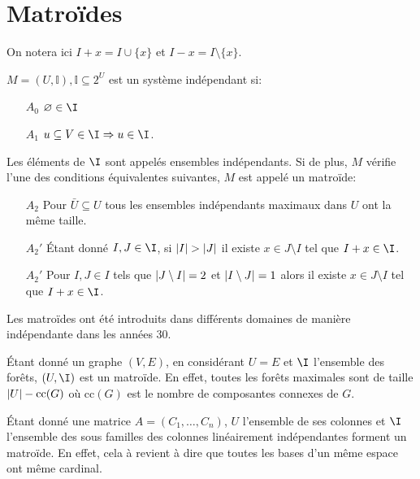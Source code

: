 \documentclass[math, info]{cours}
\begin{document}
\section{Matroïdes}
On notera ici $I + x = I\cup \{x\}$ et $I - x = I \setminus \{x\}$.

\begin{definition}
	$M = \left(U, \mathbb{I} \right), \mathbb{I} \subseteq 2^{U}$ est un système indépendant si:
	\begin{itemize}
		\item[$A_{0}$] $\emptyset \in \I$
		\item[$A_{1}$] $u \subseteq V \in \I \Rightarrow u \in \I$.
	\end{itemize}
	Les éléments de $\I$ sont appelés ensembles indépendants.
	Si de plus, $M$ vérifie l'une des conditions équivalentes suivantes, $M$ est appelé un matroïde:
	\begin{itemize}
		\item[$A_{2}$] Pour $\bar{U} \subseteq U$ tous les ensembles indépendants maximaux dans $U$ ont la même taille.
		\item[$A_{2}'$] Étant donné $I, J \in \I$, si $\left|I\right| > \left|J\right|$ il existe $x \in J \setminus I$ tel que $I + x \in \I$.
		\item[$A_{2}'$] Pour $I, J \in I$ tels que $\left|J\setminus I\right| = 2$ et $\left|I\setminus J\right| = 1$ alors il existe $x \in J \setminus I$ tel que $I + x\in \I$.
	\end{itemize}
\end{definition}
Les matroïdes ont été introduits dans différents domaines de manière indépendante dans les années 30.

\begin{exemple}
	Étant donné un graphe $(V, E)$, en considérant $U = E$ et $\I$ l'ensemble des forêts, $\left(U, \I\right)$ est un matroïde.
	En effet, toutes les forêts maximales sont de taille $\left|U\right| - \mathrm{cc}(G)$ où $\mathrm{cc}(G)$ est le nombre de composantes connexes de $G$.
\end{exemple}

\begin{exemple}
	Étant donné une matrice $A = \left(C_{1}, \ldots, C_{n}\right)$, $U$ l'ensemble de ses colonnes et $\I$ l'ensemble des sous familles des colonnes linéairement indépendantes forment un matroïde.
	En effet, cela à revient à dire que toutes les bases d'un même espace ont même cardinal.
\end{exemple}
\end{document}

